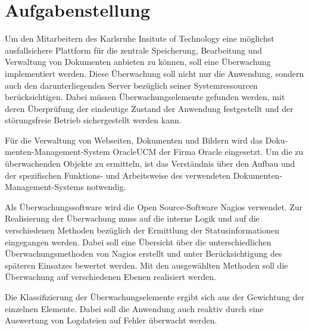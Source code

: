 \section{Aufgabenstellung}

Um den Mitarbeitern des Karlsruhe Insitute of Technology eine möglichst ausfallsichere Plattform für die zentrale Speicherung, Bearbeitung und Verwaltung von Dokumenten anbieten zu können, soll eine Überwachung implementiert werden.
Diese Überwachung soll nicht nur die Anwendung, sondern auch den darunterliegenden Server bezüglich seiner Systemressourcen berücksichtigen.
Dabei müssen Überwachungselemente gefunden werden, mit deren Überprüfung der eindeutige Zustand der Anwendung festgestellt und der störungsfreie Betrieb sichergestellt werden kann.

Für die Verwaltung von Webseiten, Dokumenten und Bildern wird das Doku-menten-Management-System \gls{OracleUCM} der Firma Oracle eingesetzt.
Um die zu überwachenden Objekte zu ermitteln, ist das Verständnis über den Aufbau und der spezifischen Funktions- und Arbeitsweise des verwendeten Dokumenten-Management-Systems notwendig.

Als Überwachungssoftware wird die Open Source-Software Nagios verwendet.
Zur Realisierung der Überwachung muss auf die interne Logik und auf die verschiedenen Methoden bezüglich der Ermittlung der Statusinformationen eingegangen werden.
Dabei soll eine Übersicht über die unterschiedlichen Überwachungsmethoden von Nagios erstellt und unter Berücksichtigung des späteren Einsatzes bewertet werden.
Mit den ausgewählten Methoden soll die Überwachung auf verschiedenen Ebenen realisiert werden.

Die Klassifizierung der Überwachungselemente ergibt sich aus der Gewichtung der einzelnen Elemente.
Dabei soll die Anwendung auch reaktiv durch eine Auswertung von Logdateien auf Fehler überwacht werden.


